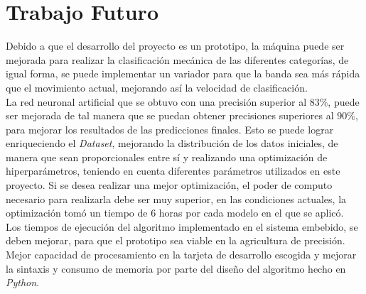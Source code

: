 	\chapter{Trabajo Futuro}

	Debido a que el desarrollo del proyecto es un prototipo, la máquina puede ser mejorada para realizar la clasificación mecánica de las diferentes categorías, de igual forma, se puede implementar un variador para que la banda sea más rápida que el movimiento actual, mejorando así la velocidad de clasificación.\\
	
	La red neuronal artificial que se obtuvo con una precisión superior al $83\%$, puede ser mejorada de tal manera que se puedan obtener precisiones superiores al $90\%$, para mejorar los resultados de las predicciones finales. Esto se puede lograr enriqueciendo el \textit{Dataset}, mejorando la distribución de los datos iniciales, de manera que sean proporcionales entre sí y realizando una optimización de hiperparámetros, teniendo en cuenta diferentes parámetros utilizados en este proyecto. Si se desea realizar una mejor optimización, el poder de computo necesario para realizarla debe ser muy superior, en las condiciones actuales, la optimización tomó un tiempo de $6$ horas por cada modelo en el que se aplicó.\\
	
	Los tiempos de ejecución del algoritmo implementado en el sistema embebido, se deben mejorar, para que el prototipo sea viable en la agricultura de precisión. Mejor capacidad de procesamiento en la tarjeta de desarrollo escogida y mejorar la sintaxis y consumo de memoria por parte del diseño del algoritmo hecho en \textit{Python}.
	
	
	
	
	





